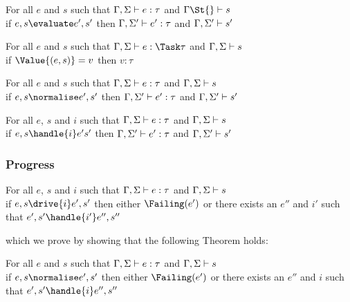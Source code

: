 \begin{theorem}
      For all $e$ and $s$ such that
      $\Gamma,\Sigma\vdash e:\tau$ and $\Gamma\St{}\infers s$\\
      if $e,s\evaluate e',s'$
      then $\Gamma,\Sigma'\vdash e':\tau$ and $\Gamma,\Sigma'\vdash s'$
      \label{thmpreseval}
\end{theorem}

\begin{lemma}
  For all $e$ and $s$ such that $\Gamma,\Sigma\infers e:\Task\tau$ and $\Gamma,\Sigma\vdash s$\\
  if $\Value{(e,s)}=v$ then $v:\tau$
  \label{lemmavaluepreserves}
\end{lemma}

\begin{theorem}
    For all $e$ and $s$ such that $\Gamma,\Sigma\vdash e:\tau$ and $\Gamma,\Sigma\vdash s$\\
    if   $e,s \normalise e',s'$ then $\Gamma,\Sigma'\vdash e':\tau$ and $\Gamma,\Sigma'\vdash s'$
    \label{thmpresnorm}
\end{theorem}

\begin{theorem}
  For all $e$, $s$ and $i$ such that $\Gamma,\Sigma\vdash e:\tau$ and $\Gamma,\Sigma\vdash s$\\
  if $ e,s \handle{i} e's'$ then $\Gamma,\Sigma'\vdash e':\tau$ and $\Gamma,\Sigma'\vdash s'$
   \label{thmpreshandle}
\end{theorem}

\subsubsection{Progress}

\begin{theorem}
 For all $e$, $s$ and $i$ such that $\Gamma,\Sigma\vdash e:\tau$ and $\Gamma,\Sigma\vdash s$\\
 if $e,s \drive{i} e',s'$ then either $\Failing(e')$ or there exists an $e''$ and $i'$ such that $e',s'\handle{i'}e'',s''$
\end{theorem}

which we prove by showing that the following Theorem holds:
\begin{theorem}
  For all $e$ and $s$ such that $\Gamma,\Sigma\vdash e:\tau$ and $\Gamma,\Sigma\vdash s$\\
  if $e,s \normalise e',s'$ then either $\Failing(e')$ or there exists an $e''$ and $i$ such that $e',s'\handle{i}e'',s''$
  \label{thmprogressnorm}
\end{theorem}

